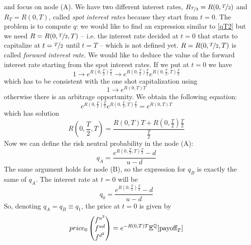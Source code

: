 and focus on node (A). We have two different interest rates, $R_{\nicefrac{T}{2}}=R(0,\nicefrac{T}{2})$ and $R_T=R(0,T)$, called \emph{spot interest rates} because they start from $t=0$. The problem is to compute $q$: we would like to find an expression similar to \eqref{qT2} but we need $R=R(0,\nicefrac{T}{2},T)$ -- i.e. the interest rate decided at $t=0$ that starts to capitalize at $t=\nicefrac{T}{2}$ until $t=T$ -- which is not defined yet. $R=R(0,\nicefrac{T}{2},T)$ is called \emph{forward interest rate}. We would like to deduce the value of the forward interest rate starting from the spot interest rates. If we put  at $t=0$ we have
\begin{equation*}
    1 \longrightarrow e^{R\left(0,\frac{T}{2}\right)\frac{T}{2}} \longrightarrow e^{R\left(0,\frac{T}{2}\right)\frac{T}{2}}e^{R\left(0,\frac{T}{2},T\right)\frac{T}{2}}
\end{equation*}
which has to be consistent with the one shot capitalization using
\begin{equation*}
    1\longrightarrow e^{R(0,T)T}
\end{equation*}
otherwise there is an arbitrage opportunity. We obtain the following equation:
\begin{equation}\label{equality}
    e^{R\left(0,\frac{T}{2}\right)\frac{T}{2}}e^{R\left(0,\frac{T}{2},T\right)\frac{T}{2}} = e^{R(0,T)T}
\end{equation}
which has solution
\begin{equation}
    R\left(0,\frac{T}{2},T\right) = \dfrac{R(0,T)T + R\left(0,\frac{T}{2}\right)\frac{T}{2}}{\frac{T}{2}}
\end{equation}
Now we can define the risk neutral probability in the node (A):
\begin{equation}
    q_A = \dfrac{e^{R\left(0,\frac{T}{2},T\right)\frac{T}{2}}-d}{u-d}
\end{equation}
The same argument holds for node (B), so the expression for $q_B$ is exactly the same of $q_A$. The interest rate at $t=0$ will be
\begin{equation}
    q_0 = \dfrac{e^{R\left(0,\frac{T}{2}\right)\frac{T}{2}}-d}{u-d}
\end{equation}
So, denoting $q_A = q_B \equiv q_1$, the price at $t=0$ is given by
\begin{equation}\label{p00}
    price_0
    \left(
    \begin{matrix}
        f^{u^2} \\ f^{ud} \\ f^{d^2}
    \end{matrix}
    \right)
    = e^{-R(0,T)T} \mathbb{E}^{\mathbb{Q}}[\mbox{payoff}_T]
\end{equation}
